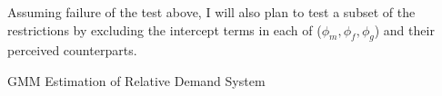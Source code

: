 \documentclass{article}
\begin{document}
Assuming failure of the test above, I will also plan to test a subset of the restrictions by excluding the intercept terms in each of ($\phi_{m},\phi_{f},\phi_{g}$) and their perceived counterparts.



\begin{table}\footnotesize\caption{\label{res1}GMM Estimation of Relative Demand System}
    \begin{center}
        
        \captionsetup{width=0.7\textwidth}
    \end{center}
\end{table}

%         
\end{document}
